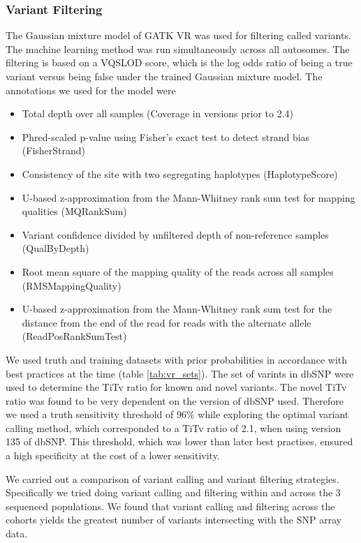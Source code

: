 \subsubsection{Variant Filtering}
The Gaussian mixture model of \gls{GATK} \gls{VR} was used for filtering called variants. The machine learning method was run simultaneously across all autosomes. The filtering is based on a \gls{VQSLOD} score, which is the log odds ratio of being a true variant versus being false under the trained Gaussian mixture model. The annotations we used for the model were
\begin{itemize}
\item Total depth over all samples (Coverage in versions prior to 2.4)
\item Phred-scaled p-value using Fisher’s exact test to detect strand bias (FisherStrand)
\item Consistency of the site with two segregating haplotypes (HaplotypeScore)
\item U-based z-approximation from the Mann-Whitney rank sum test for mapping qualities (MQRankSum)
\item Variant confidence divided by unfiltered depth of non-reference samples (QualByDepth)
\item Root mean square of the mapping quality of the reads across all samples (RMSMappingQuality)
\item U-based z-approximation from the Mann-Whitney rank sum test for the distance from the end of the read for reads with the alternate allele (ReadPosRankSumTest)
\end{itemize}

We used truth and training datasets with prior probabilities in accordance with best practices at the time (table \ref{tab:vr_sets}). The set of varints in \gls{dbSNP}\cite{Wheeler01012007} were used to determine the \gls{TiTv} ratio for known and novel variants. The novel \gls{TiTv} ratio was found to be very dependent on the version of \gls{dbSNP} used. Therefore we used a truth sensitivity threshold of 96\% while exploring the optimal variant calling method, which corresponded to a \gls{TiTv} ratio of 2.1, when using version 135 of \gls{dbSNP}. This threshold, which was lower than later best practises, ensured a high specificity at the cost of a lower sensitivity.


We carried out a comparison of variant calling and variant filtering strategies. Specifically we tried doing variant calling and filtering within and across the 3 sequenced populations. We found that variant calling and filtering across the cohorts yields the greatest number of variants intersecting with the SNP array data.

